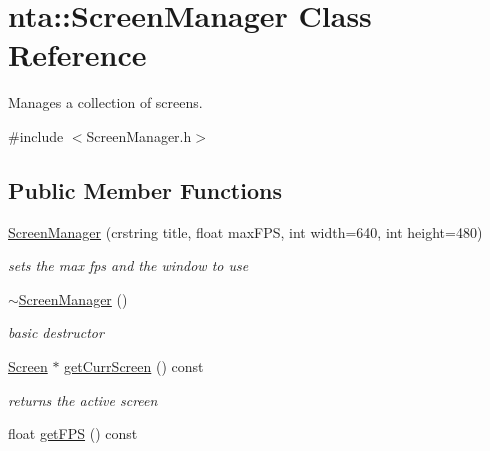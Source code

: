 \hypertarget{classnta_1_1ScreenManager}{}\section{nta\+:\+:Screen\+Manager Class Reference}
\label{classnta_1_1ScreenManager}


Manages a collection of screens.  




{\ttfamily \#include $<$Screen\+Manager.\+h$>$}

\subsection*{Public Member Functions}
\begin{DoxyCompactItemize}
\item 
\mbox{\label{classnta_1_1ScreenManager_a08ff6088b399f4253b838db207d64d96}} 
\hyperlink{classnta_1_1ScreenManager_a08ff6088b399f4253b838db207d64d96}{Screen\+Manager} (crstring title, float max\+F\+PS, int width=640, int height=480)
\begin{DoxyCompactList}\small\item\em sets the max fps and the window to use \end{DoxyCompactList}\item 
\mbox{\label{classnta_1_1ScreenManager_aea609a639ffdc377e798eda054e6a4ba}} 
\hyperlink{classnta_1_1ScreenManager_aea609a639ffdc377e798eda054e6a4ba}{$\sim$\+Screen\+Manager} ()
\begin{DoxyCompactList}\small\item\em basic destructor \end{DoxyCompactList}\item 
\hyperlink{classnta_1_1Screen}{Screen} $\ast$ \hyperlink{classnta_1_1ScreenManager_a4b26e8adc481bfb37a088e047e4ccc2a}{get\+Curr\+Screen} () const
\begin{DoxyCompactList}\small\item\em returns the active screen \end{DoxyCompactList}\item 
\mbox{\label{classnta_1_1ScreenManager_a24e61f523b383277b7284cab76ad9e5a}} 
float \hyperlink{classnta_1_1ScreenManager_a24e61f523b383277b7284cab76ad9e5a}{get\+F\+PS} () const

\end{DoxyCompactItemize}
